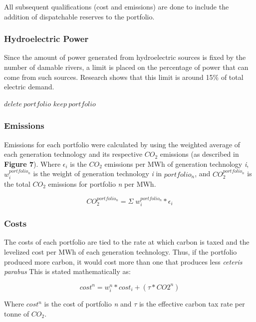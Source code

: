 \documentclass{article}
\begin{document}
All subsequent qualifications (cost and emissions) are done to include the addition of dispatchable reserves to the portfolio.

\subsubsection{Hydroelectric Power}
Since the amount of power generated from hydroelectric sources is fixed by the number of damable rivers, a limit is placed on the percentage of power that can come from such sources. Research shows that this limit is around 15\% of total electric demand. 

\begin{algorithmic}
		\STATE $delete \: portfolio$
	\ELSE
		\STATE $keep \: portfolio$
	\ENDIF
\end{algorithmic}

\subsubsection{Emissions}
Emissions for each portfolio were calculated by using the weighted average of each generation technology and its respective $CO_2$ emissions (as described in {\bf Figure 7}). Where $\epsilon_{i} $ is the $CO_2$ emissions per MWh of generation technology \emph{i}, $w^{ portfolio_n}_{i}$ is the weight of generation technology \emph{i} in $ portfolio_n$, and $CO_{2}^{portfolio_n}$ is the total $CO_2$ emissions for portfolio \emph{n} per MWh. 

\begin{equation}
CO_{2}^{portfolio_n} = \Sigma\; w^{portfolio_n}_{i}* \epsilon_{i} 
\end{equation}

\subsubsection{Costs}
The costs of each portfolio are tied to the rate at which carbon is taxed and the levelized cost per MWh of each generation technology. Thus, if the portfolio produced more carbon, it would cost more than one that produces less \emph{ceteris parabus} This is stated mathematically as:

\begin{equation}
cost^n = w^{n}_{i} * cost_{i} + (\tau*CO{2}^n)
\end{equation}

Where $cost^n$ is the cost of portfolio \emph{n} and $\tau$ is the effective carbon tax rate per tonne of $CO_2$. \*
\end{document}
